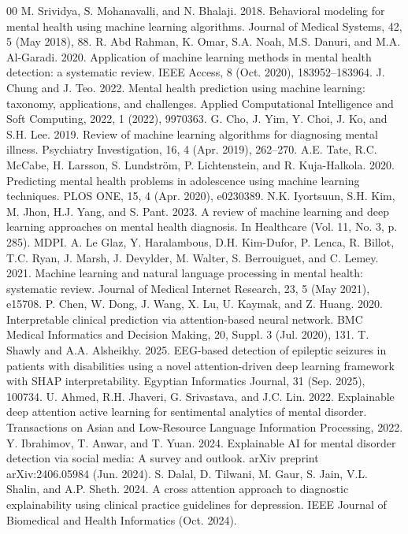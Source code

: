 \documentclass[conference]{IEEEtran}
\begin{document}
\begin{thebibliography}{00}
 M. Srividya, S. Mohanavalli, and N. Bhalaji. 2018. Behavioral modeling for mental health using machine learning algorithms. Journal of Medical Systems, 42, 5 (May 2018), 88.
 R. Abd Rahman, K. Omar, S.A. Noah, M.S. Danuri, and M.A. Al-Garadi. 2020. Application of machine learning methods in mental health detection: a systematic review. IEEE Access, 8 (Oct. 2020), 183952--183964.
 J. Chung and J. Teo. 2022. Mental health prediction using machine learning: taxonomy, applications, and challenges. Applied Computational Intelligence and Soft Computing, 2022, 1 (2022), 9970363.
 G. Cho, J. Yim, Y. Choi, J. Ko, and S.H. Lee. 2019. Review of machine learning algorithms for diagnosing mental illness. Psychiatry Investigation, 16, 4 (Apr. 2019), 262--270.
 A.E. Tate, R.C. McCabe, H. Larsson, S. Lundström, P. Lichtenstein, and R. Kuja-Halkola. 2020. Predicting mental health problems in adolescence using machine learning techniques. PLOS ONE, 15, 4 (Apr. 2020), e0230389.
 N.K. Iyortsuun, S.H. Kim, M. Jhon, H.J. Yang, and S. Pant. 2023. A review of machine learning and deep learning approaches on mental health diagnosis. In Healthcare (Vol. 11, No. 3, p. 285). MDPI.
 A. Le Glaz, Y. Haralambous, D.H. Kim-Dufor, P. Lenca, R. Billot, T.C. Ryan, J. Marsh, J. Devylder, M. Walter, S. Berrouiguet, and C. Lemey. 2021. Machine learning and natural language processing in mental health: systematic review. Journal of Medical Internet Research, 23, 5 (May 2021), e15708.
 P. Chen, W. Dong, J. Wang, X. Lu, U. Kaymak, and Z. Huang. 2020. Interpretable clinical prediction via attention-based neural network. BMC Medical Informatics and Decision Making, 20, Suppl. 3 (Jul. 2020), 131.
 T. Shawly and A.A. Alsheikhy. 2025. EEG-based detection of epileptic seizures in patients with disabilities using a novel attention-driven deep learning framework with SHAP interpretability. Egyptian Informatics Journal, 31 (Sep. 2025), 100734.
 U. Ahmed, R.H. Jhaveri, G. Srivastava, and J.C. Lin. 2022. Explainable deep attention active learning for sentimental analytics of mental disorder. Transactions on Asian and Low-Resource Language Information Processing, 2022.
 Y. Ibrahimov, T. Anwar, and T. Yuan. 2024. Explainable AI for mental disorder detection via social media: A survey and outlook. arXiv preprint arXiv:2406.05984 (Jun. 2024).
 S. Dalal, D. Tilwani, M. Gaur, S. Jain, V.L. Shalin, and A.P. Sheth. 2024. A cross attention approach to diagnostic explainability using clinical practice guidelines for depression. IEEE Journal of Biomedical and Health Informatics (Oct. 2024).

\end{thebibliography}
\end{document}
